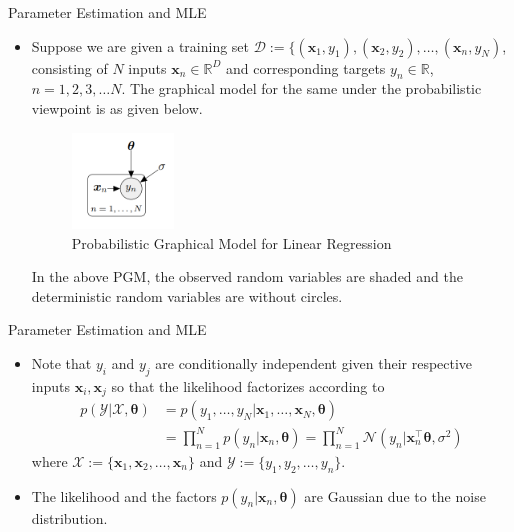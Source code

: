 \documentclass{beamer}
\begin{document}
\begin{frame}{Parameter Estimation and MLE}
\begin{itemize}[<+->]
\item  Suppose we are given a training set $\mathcal{D} := \{ (\boldsymbol{x}_1, y_1), (\boldsymbol{x}_2, y_2), \dots, (\boldsymbol{x}_n, y_N)$, consisting of $N$ inputs $\boldsymbol{x}_n \in \mathbb{R}^{D}$ and corresponding targets $y_n \in \mathbb{R}$, $n = 1, 2, 3, \dots N$. The graphical model for the same under the probabilistic viewpoint is as given below.
\begin{figure}[htp]
	\centering
	\includegraphics[width=2.7cm]{figures/graphicalmodel.png}
	\caption{Probabilistic Graphical Model for Linear Regression}
	\label{fig:pgmlr}
\end{figure}
\pause
In the above PGM, the observed random variables are shaded and the deterministic random variables are without circles.
\end{itemize}
\end{frame}


\begin{frame}{Parameter Estimation and MLE}
\begin{itemize}[<+->]
\item  Note that $y_i$ and $y_j$ are conditionally independent given their respective inputs $\boldsymbol{x}_i, \boldsymbol{x}_j$ so that the likelihood factorizes according to 
\begin{equation*}
\begin{aligned}
p(\mathcal{Y} | \mathcal{X}, \boldsymbol{\theta}) &=p\left(y_{1}, \ldots, y_{N} | \boldsymbol{x}_{1}, \ldots, \boldsymbol{x}_{N}, \boldsymbol{\theta}\right) \\
&=\prod_{n=1}^{N} p\left(y_{n} | \boldsymbol{x}_{n}, \boldsymbol{\theta}\right)=\prod_{n=1}^{N} \mathcal{N}\left(y_{n} | \boldsymbol{x}_{n}^{\top} \boldsymbol{\theta}, \sigma^{2}\right)
\end{aligned}
\end{equation*}
where $\mathcal{X}:= \{ \boldsymbol{x}_1, \boldsymbol{x}_2, \dots, \boldsymbol{x}_n \}$ and   $\mathcal{Y}:= \{ y_1, y_2, \dots, y_n \}$.
\item The likelihood and the factors $p(y_n | \boldsymbol{x}_n, \boldsymbol{\theta})$ are Gaussian due to the noise distribution.
\end{itemize}
\end{frame}
\end{document}
